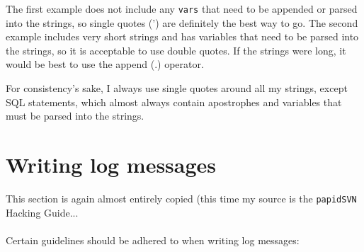         The first example does not include any \texttt{vars} that need to be appended or parsed into the strings,
        so single quotes (') are definitely the best way to go. The second example includes very short strings and
        has variables that need to be parsed into the strings, so it is acceptable to use double quotes. If the strings
        were long, it would be best to use the append (.) operator.

        For consistency's sake, I always use single quotes around all my strings, except SQL statements, which almost
        always contain apostrophes and variables that must be parsed into the strings.

\section{Writing log messages}
    This section is again almost entirely copied (this time my source
    is the \texttt{papidSVN} Hacking Guide...\\
    \\
    Certain guidelines should be adhered to when writing log messages:
